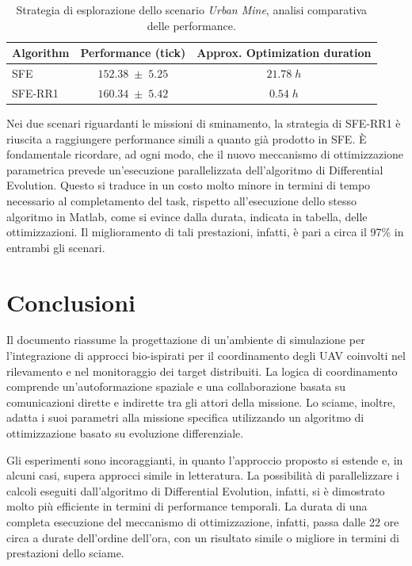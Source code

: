\begin{table}[H]
    \centering
    \captionsetup{justification=centering, margin=2cm, font=footnotesize}
    \begin{tabular}{|l|c|c|}
    \hline
    \textbf{Algorithm}              & \textbf{Performance (tick)}       & \textbf{Approx. Optimization duration}      \\ \hline
    SFE                             & $152.38 \; \pm \; 5.25$           &$21.78 \; h$       \\ \hline
    SFE-RR1                         & $160.34 \; \pm \; 5.42$           &$0.54  \; h$       \\ \hline
    \end{tabular}%
    
    \caption{Strategia di esplorazione dello scenario \textit{Urban Mine}, analisi comparativa delle performance.}
    \label{analisi_comparativa_esplorazione_urbanMine}
\end{table}

Nei due scenari riguardanti le missioni di sminamento, la strategia di SFE-RR1 è riuscita a raggiungere performance simili a quanto già prodotto in SFE.
\`E fondamentale ricordare, ad ogni modo, che il nuovo meccanismo di ottimizzazione parametrica prevede un'esecuzione parallelizzata dell'algoritmo di Differential Evolution.
Questo si traduce in un costo molto minore in termini di tempo necessario al completamento del task, rispetto all'esecuzione dello stesso algoritmo in Matlab, come si evince dalla durata, indicata in tabella, delle ottimizzazioni.
Il miglioramento di tali prestazioni, infatti, è pari a circa il 97\% in entrambi gli scenari.

\newpage
\section{Conclusioni}

Il documento riassume la progettazione di un'ambiente di simulazione per l’integrazione di approcci bio-ispirati per il coordinamento degli UAV coinvolti nel rilevamento e nel monitoraggio dei target distribuiti. 
La logica di coordinamento comprende un'autoformazione spaziale e una collaborazione basata su comunicazioni dirette e indirette tra gli attori della missione. 
Lo sciame, inoltre, adatta i suoi parametri alla missione specifica utilizzando un algoritmo di ottimizzazione basato su evoluzione differenziale. 

Gli esperimenti sono incoraggianti, in quanto l'approccio proposto si estende e, in alcuni casi, supera approcci simile in letteratura. 
La possibilità di parallelizzare i calcoli eseguiti dall'algoritmo di Differential Evolution, infatti, si è dimostrato molto più efficiente in termini di performance temporali.
La durata di una completa esecuzione del meccanismo di ottimizzazione, infatti, passa dalle 22 ore circa a durate dell'ordine dell'ora, con un risultato simile o migliore in termini di prestazioni dello sciame.


